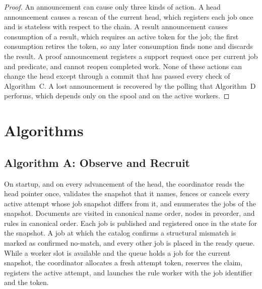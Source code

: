 \documentclass[11pt,a4paper]{article}
\theoremstyle{plain}
\theoremstyle{definition}
\theoremstyle{remark}
\theoremstyle{definition}
\begin{document}
\begin{proof}
An announcement can cause only three kinds of action. A head announcement causes a rescan of the current head, which registers each job once and is stateless with respect to the chain. A result announcement causes consumption of a result, which requires an active token for the job; the first consumption retires the token, so any later consumption finds none and discards the result. A proof announcement registers a support request once per current job and predicate, and cannot reopen completed work. None of these actions can change the head except through a commit that has passed every check of Algorithm~C. A lost announcement is recovered by the polling that Algorithm~D performs, which depends only on the spool and on the active workers.
\end{proof}

\section{Algorithms}
\label{sec:algorithms}

\subsection{Algorithm A: Observe and Recruit}

On startup, and on every advancement of the head, the coordinator reads the head pointer once, validates the snapshot that it names, fences or cancels every active attempt whose job snapshot differs from it, and enumerates the jobs of the snapshot. Documents are visited in canonical name order, nodes in preorder, and rules in canonical order. Each job is published and registered once in the state for the snapshot. A job at which the catalog confirms a structural mismatch is marked as confirmed no-match, and every other job is placed in the ready queue. While a worker slot is available and the queue holds a job for the current snapshot, the coordinator allocates a fresh attempt token, reserves the claim, registers the active attempt, and launches the rule worker with the job identifier and the token.
\end{document}
